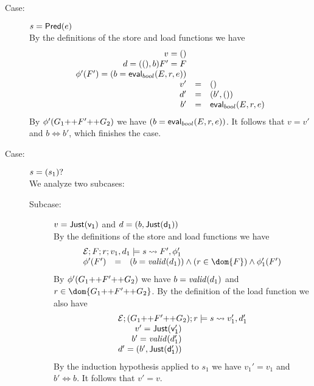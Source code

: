 {\begin{description}
\item[Case:] $s = \mathsf{Pred}(e)$\\[1ex]
%
By the definitions of the store and load functions we have
\[
\begin{array}{rcll}
v = ()\\
d = ((),b)
F' = F\\
\phi'(F') = (b = \mathsf{eval}_{bool}(E,r,e))\\
v' &=& ()\\
d' &=& (b',())\\
b' &=& \mathsf{eval}_{bool}(E,r,e)\\
\end{array}
\]
By $\phi'(G_1 \text{++} F' \text{++} G_2)$ we have $(b =
\mathsf{eval}_{bool}(E,r,e))$. It follows that $v = v'$ and $b \iff b'$, which
finishes the case.

\item[Case:] $s = (s_1)?$\\[1ex]
%
We analyze two subcases:
\begin{description}
\item[Subcase:] $v = \mathsf{Just(v_1)}$ and $d = (b,\mathsf{Just(d_1)})$\\[1ex]
%
By the definitions of the store and load functions we have
\[
\begin{array}{rcll}
\multicolumn{3}{l}{\store{\Env}{F}{r}{ v_1,d_1 }{s}{ F',\phi_1' }}\\
\phi'(F') &=& (b = \valid{d_1}) \wedge (r \in \dom{F}) \wedge \phi_1'(F')
\end{array}
\]
%
By $\phi'(G_1 \text{++} F' \text{++} G_2)$ we have $b = \mathit{valid}(d_1)$ and
$r \in \dom{G_1 \FAppend F' \FAppend G_2}$.  By the definition of the
load function we also have
\[ 
\begin{array}{rcll}
\multicolumn{3}{l}{\load{\Env}{(G_1 \FAppend F' \FAppend G_2)}{r}{s}{v_1',d_1'}}\\
v' = \Just{v_1'}\\
b' = \valid{d_1'}\\
d' = (b',\Just{d_1'})\\
\end{array}
\]
By the induction hypothesis applied to $s_1$ we have $v_1' = v_1$ and
$b' \iff b$. It follows that $v' = v$.


\end{description}
\end{description}}
